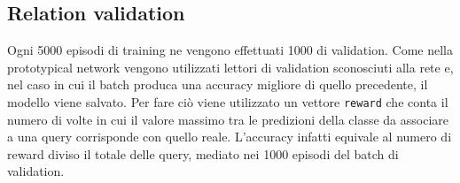 \documentclass[12pt,a4paper,titlepage]{article}
\begin{document}
\subsection{Relation validation}
Ogni 5000 episodi di training ne vengono effettuati 1000 di validation.
Come nella prototypical network vengono utilizzati lettori di validation sconosciuti alla rete e, nel caso in cui il batch produca una accuracy migliore di quello precedente, il modello viene salvato.
Per fare ciò viene utilizzato un vettore \texttt{reward} che conta il numero di volte in cui il valore massimo tra le predizioni della classe da associare a una query corrisponde con quello reale.
L'accuracy infatti equivale al numero di reward diviso il totale delle query, mediato nei 1000 episodi del batch di validation.
\clearpage
\nocite{*}
\printbibliography
\end{document}
